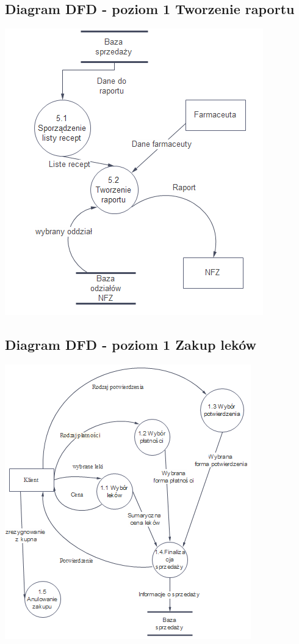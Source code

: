\documentclass[a4paper, 11pt]{article}
\begin{document}
	\subsection{Diagram DFD - poziom 1 Tworzenie raportu}
		\includegraphics[scale=1]{tworzenieRaportu.PNG} 
		
	\subsection{Diagram DFD - poziom 1 Zakup leków}
		\includegraphics[scale=1]{zakupLekow2.PNG} 	
\end{document}
